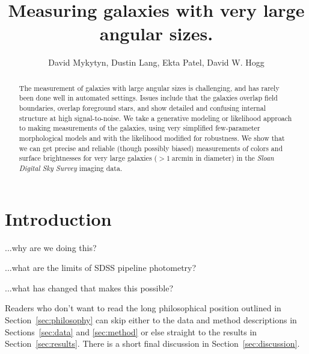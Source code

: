 \documentclass[12pt,preprint,pdftex]{aastex}
\newcounter{address}
\newcommand{\project}[1]{\textsl{#1}}
\newcommand{\sectionname}{Section}
\newcommand{\sectionnames}{\sectionname s}
\newcommand{\units}[1]{\mathrm{#1}}
\renewcommand{\arcmin}{\units{arcmin}}
\begin{document}
\title{
       Measuring galaxies with very large angular sizes.
      }
\author{
        David Mykytyn\altaffilmark{\ref{CCPP}},
        Dustin Lang\altaffilmark{\ref{CMU}},
        Ekta Patel\altaffilmark{\ref{CCPP}},
        David W. Hogg\altaffilmark{\ref{CCPP},\ref{MPIA},\ref{email}}
       }
\setcounter{address}{1}

\begin{abstract}
The measurement of galaxies with large angular sizes is challenging,
and has rarely been done well in automated settings.  Issues include
that the galaxies overlap field boundaries, overlap foreground stars,
and show detailed and confusing internal structure at high
signal-to-noise.  We take a generative modeling or likelihood approach
to making measurements of the galaxies, using very simplified
few-parameter morphological models and with the likelihood modified
for robustness.  We show that we can get precise and reliable (though
possibly biased) measurements of colors and surface brightnesses for
very large galaxies ($>1~\arcmin$ in diameter) in the \project{Sloan
  Digital Sky Survey} imaging data.
\end{abstract}

\section{Introduction}

...why are we doing this?

...what are the limits of SDSS pipeline photometry?

...what has changed that makes this possible?

Readers who don't want to read the long philosophical position
outlined in \sectionname~\ref{sec:philosophy} can skip either to the
data and method descriptions in \sectionnames~\ref{sec:data} and
\ref{sec:method} or else straight to the results in
\sectionname~\ref{sec:results}.  There is a short final discussion in
\sectionname~\ref{sec:discussion}.
\end{document}
